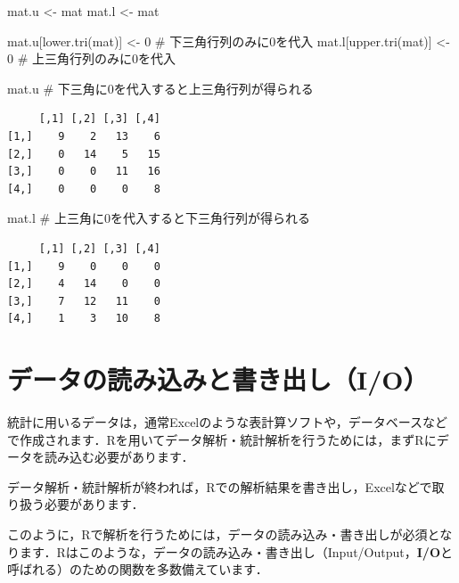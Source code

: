 \documentclass[
  letterpaper,
  DIV=11,
  numbers=noendperiod]{scrreprt}
\newenvironment{Shaded}{\begin{snugshade}}{\end{snugshade}}
\newcommand{\CommentTok}[1]{\textcolor[rgb]{0.37,0.37,0.37}{#1}}
\newcommand{\DecValTok}[1]{\textcolor[rgb]{0.68,0.00,0.00}{#1}}
\newcommand{\FunctionTok}[1]{\textcolor[rgb]{0.28,0.35,0.67}{#1}}
\newcommand{\NormalTok}[1]{\textcolor[rgb]{0.00,0.23,0.31}{#1}}
\newcommand{\OtherTok}[1]{\textcolor[rgb]{0.00,0.23,0.31}{#1}}
\begin{document}
\begin{Shaded}
\begin{Highlighting}[]
\NormalTok{mat.u }\OtherTok{\textless{}{-}}\NormalTok{ mat}
\NormalTok{mat.l }\OtherTok{\textless{}{-}}\NormalTok{ mat}

\NormalTok{mat.u[}\FunctionTok{lower.tri}\NormalTok{(mat)] }\OtherTok{\textless{}{-}} \DecValTok{0} \CommentTok{\# 下三角行列のみに0を代入}
\NormalTok{mat.l[}\FunctionTok{upper.tri}\NormalTok{(mat)] }\OtherTok{\textless{}{-}} \DecValTok{0} \CommentTok{\# 上三角行列のみに0を代入}

\NormalTok{mat.u }\CommentTok{\# 下三角に0を代入すると上三角行列が得られる}
\end{Highlighting}
\end{Shaded}

\begin{verbatim}
     [,1] [,2] [,3] [,4]
[1,]    9    2   13    6
[2,]    0   14    5   15
[3,]    0    0   11   16
[4,]    0    0    0    8
\end{verbatim}

\begin{Shaded}
\begin{Highlighting}[]
\NormalTok{mat.l }\CommentTok{\# 上三角に0を代入すると下三角行列が得られる}
\end{Highlighting}
\end{Shaded}

\begin{verbatim}
     [,1] [,2] [,3] [,4]
[1,]    9    0    0    0
[2,]    4   14    0    0
[3,]    7   12   11    0
[4,]    1    3   10    8
\end{verbatim}


\hypertarget{ux30c7ux30fcux30bfux306eux8aadux307fux8fbcux307fux3068ux66f8ux304dux51faux3057io}{%
\chapter{データの読み込みと書き出し（I/O）}\label{ux30c7ux30fcux30bfux306eux8aadux307fux8fbcux307fux3068ux66f8ux304dux51faux3057io}}

統計に用いるデータは，通常Excelのような表計算ソフトや，データベースなどで作成されます．Rを用いてデータ解析・統計解析を行うためには，まずRにデータを読み込む必要があります．

データ解析・統計解析が終われば，Rでの解析結果を書き出し，Excelなどで取り扱う必要があります．

このように，Rで解析を行うためには，データの読み込み・書き出しが必須となります．Rはこのような，データの読み込み・書き出し（Input/Output，\textbf{I/O}と呼ばれる）のための関数を多数備えています．
\end{document}
